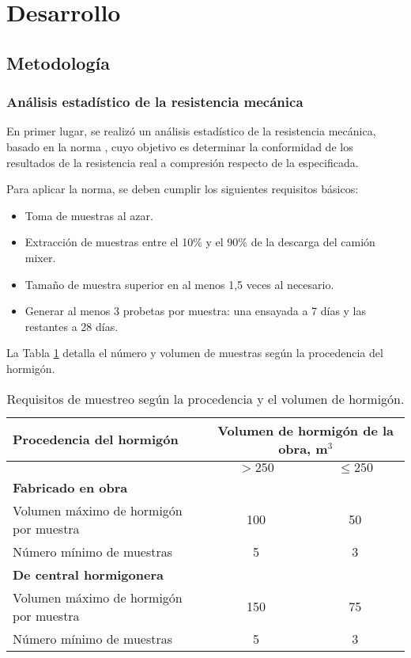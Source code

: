 \section{Desarrollo}

\subsection{Metodología}

\subsubsection{Análisis estadístico de la resistencia mecánica}

En primer lugar, se realizó un análisis estadístico de la resistencia mecánica, basado en la norma \cite{NCh1998}, cuyo objetivo es determinar la conformidad de los resultados de la resistencia real a compresión respecto de la especificada.

Para aplicar la norma, se deben cumplir los siguientes requisitos básicos:

\begin{itemize}
    \item Toma de muestras al azar.
    \item Extracción de muestras entre el 10\% y el 90\% de la descarga del camión mixer.
    \item Tamaño de muestra superior en al menos 1,5 veces al necesario.
    \item Generar al menos 3 probetas por muestra: una ensayada a 7 días y las restantes a 28 días.
\end{itemize}

La Tabla \ref{tab:muestreo} detalla el número y volumen de muestras según la procedencia del hormigón.

\begin{table}[H]
\centering
\begin{tabular}{|l|c|c|}
\hline
\textbf{Procedencia del hormigón} & \multicolumn{2}{c|}{\textbf{Volumen de hormigón de la obra, m$^3$}} \\ \hline
                                  & $> 250$ & $\leq 250$ \\ \hline
\textbf{Fabricado en obra}        &         &            \\ \hline
Volumen máximo de hormigón por muestra & 100     & 50        \\ \hline
Número mínimo de muestras              & 5       & 3         \\ \hline
\textbf{De central hormigonera}   &         &            \\ \hline
Volumen máximo de hormigón por muestra & 150     & 75        \\ \hline
Número mínimo de muestras              & 5       & 3         \\ \hline
\end{tabular}
\caption{Requisitos de muestreo según la procedencia y el volumen de hormigón.}
\label{tab:muestreo}
\end{table}

